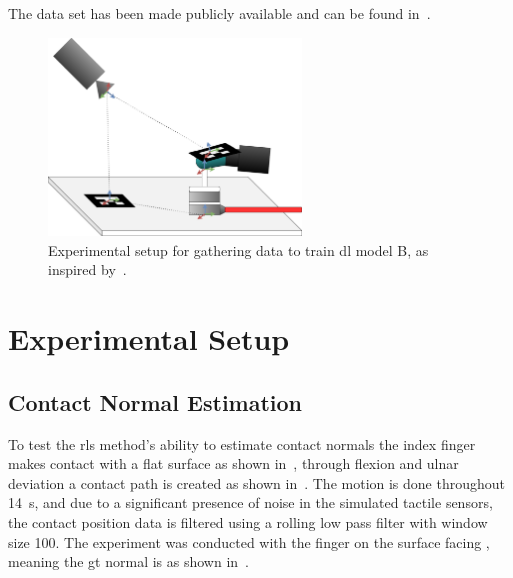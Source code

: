 The data set has been made publicly available and can be found in~\cite{biotac-dataset}.

\begin{figure}[!h]
	\begin{center}
		\includegraphics[width=0.6\textwidth]{chapters/1-tactile-perception/fig/drawio/biotac-sim-experimental-setup.pdf}
	\end{center}
	\caption{Experimental setup for gathering data to train \gls{dl} model B, as inspired by~\cite{simulation-of-the-syntouch-biotac-sensor}.}
	\label{fig:biotac-sim-experimental-setup}
\end{figure}
\newpage
\section{Experimental Setup}\label{sec:1-tactile-perception-experimental-setup}

\subsection{Contact Normal Estimation}\label{sec:1-tactile-perception-experimental-setup-contact-normal-estimation}

To test the \gls{rls} method's ability to estimate contact normals the index finger makes contact with a flat surface as shown in~, through flexion and ulnar deviation a contact path is created as shown in~. The motion is done throughout \SI{14}{\second}, and due to a significant presence of noise in the simulated tactile sensors, the contact position data is filtered using a rolling low pass filter with window size \num{100}. The experiment was conducted with the finger on the surface facing , meaning the \gls{gt} normal is  as shown in~.

